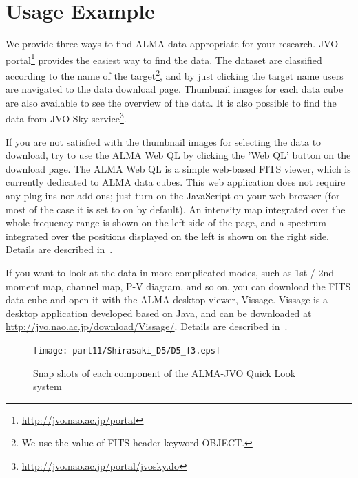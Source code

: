 \section{Usage Example}

We provide three ways to find ALMA data appropriate for your research. JVO portal\footnote{\url{http://jvo.nao.ac.jp/portal}}\citep{Shirasaki_2011} provides the easiest way to find the data. The dataset are classified according to the name of the target\footnote{We use the value of FITS header keyword OBJECT.}, and by just clicking the target name users are navigated to the data download page. Thumbnail images for each data cube are also available to see the overview of  the data. It is also possible to find the data from JVO Sky  service\footnote{\url{http://jvo.nao.ac.jp/portal/jvosky.do}}.

If you are not satisfied with the thumbnail images for selecting the data to download, try to use the ALMA Web QL by clicking the 'Web QL' button on the download page. The ALMA Web QL is a simple web-based FITS viewer, which is currently dedicated to ALMA data cubes. This web application does not require any plug-ins nor add-ons; just turn on the JavaScript on your web browser (for most of the case it is set to on by default). An intensity map integrated over the whole frequency range is shown on the left side of the page, and a spectrum integrated over the positions displayed on the left is shown on the right side. Details are described in~\cite{O10_adassxxii}.

If you want to look at the data in more complicated modes, such as 1st / 2nd moment map, channel map, P-V diagram, and so on, you can download the FITS data cube and open it with the ALMA desktop viewer, Vissage. Vissage is a desktop application developed based on Java, and can be downloaded at \url{http://jvo.nao.ac.jp/download/Vissage/}. Details are described in~\cite{P047_adassxxii}.


\begin{figure}[t]
\begin{center}
\texttt{[image: part11/Shirasaki\_D5/D5\_f3.eps]}
\caption{Snap shots of each component of the ALMA-JVO Quick Look system}
\label{Shfig:arch}
\end{center}
\end{figure}


